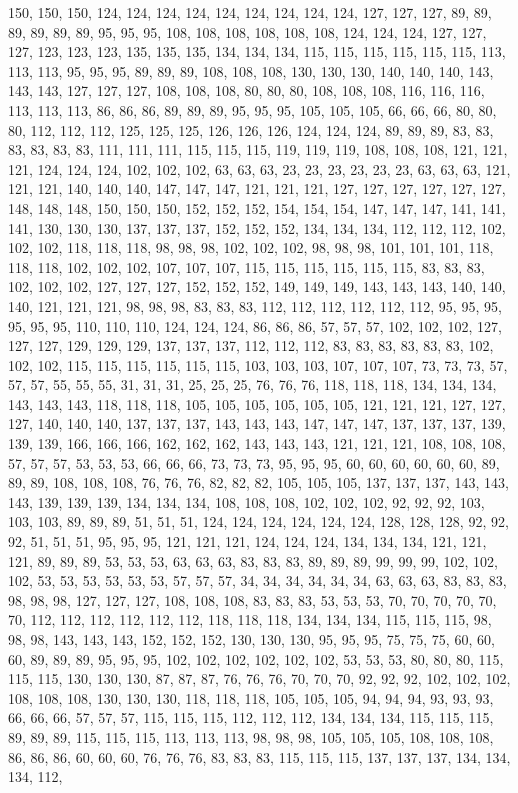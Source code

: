 150, 150, 150, 124, 124, 124, 124, 124, 124, 124, 124, 124, 127, 127, 127, 89, 89, 89, 89, 89, 89, 95, 95, 95, 108, 108, 108, 108, 108, 108, 124, 124, 124, 127, 127, 127, 123, 123, 123, 135, 135, 135, 134, 134, 134, 115, 115, 115, 115, 115, 115, 113, 113, 113, 95, 95, 95, 89, 89, 89, 108, 108, 108, 130, 130, 130, 140, 140, 140, 143, 143, 143, 127, 127, 127, 108, 108, 108, 80, 80, 80, 108, 108, 108, 116, 116, 116, 113, 113, 113, 86, 86, 86, 89, 89, 89, 95, 95, 95, 105, 105, 105, 66, 66, 66, 80, 80, 80, 112, 112, 112, 125, 125, 125, 126, 126, 126, 124, 124, 124, 89, 89, 89, 83, 83, 83, 83, 83, 83, 111, 111, 111, 115, 115, 115, 119, 119, 119, 108, 108, 108, 121, 121, 121, 124, 124, 124, 102, 102, 102, 63, 63, 63, 23, 23, 23, 23, 23, 23, 63, 63, 63, 121, 121, 121, 140, 140, 140, 147, 147, 147, 121, 121, 121, 127, 127, 127, 127, 127, 127, 148, 148, 148, 150, 150, 150, 152, 152, 152, 154, 154, 154, 147, 147, 147, 141, 141, 141, 130, 130, 130, 137, 137, 137, 152, 152, 152, 134, 134, 134, 112, 112, 112, 102, 102, 102, 118, 118, 118, 98, 98, 98, 102, 102, 102, 98, 98, 98, 101, 101, 101, 118, 118, 118, 102, 102, 102, 107, 107, 107, 115, 115, 115, 115, 115, 115, 83, 83, 83, 102, 102, 102, 127, 127, 127, 152, 152, 152, 149, 149, 149, 143, 143, 143, 140, 140, 140, 121, 121, 121, 98, 98, 98, 83, 83, 83, 112, 112, 112, 112, 112, 112, 95, 95, 95, 95, 95, 95, 110, 110, 110, 124, 124, 124, 86, 86, 86, 57, 57, 57, 102, 102, 102, 127, 127, 127, 129, 129, 129, 137, 137, 137, 112, 112, 112, 83, 83, 83, 83, 83, 83, 102, 102, 102, 115, 115, 115, 115, 115, 115, 103, 103, 103, 107, 107, 107, 73, 73, 73, 57, 57, 57, 55, 55, 55, 31, 31, 31, 25, 25, 25, 76, 76, 76, 118, 118, 118, 134, 134, 134, 143, 143, 143, 118, 118, 118, 105, 105, 105, 105, 105, 105, 121, 121, 121, 127, 127, 127, 140, 140, 140, 137, 137, 137, 143, 143, 143, 147, 147, 147, 137, 137, 137, 139, 139, 139, 166, 166, 166, 162, 162, 162, 143, 143, 143, 121, 121, 121, 108, 108, 108, 57, 57, 57, 53, 53, 53, 66, 66, 66, 73, 73, 73, 95, 95, 95, 60, 60, 60, 60, 60, 60, 89, 89, 89, 108, 108, 108, 76, 76, 76, 82, 82, 82, 105, 105, 105, 137, 137, 137, 143, 143, 143, 139, 139, 139, 134, 134, 134, 108, 108, 108, 102, 102, 102, 92, 92, 92, 103, 103, 103, 89, 89, 89, 51, 51, 51, 124, 124, 124, 124, 124, 124, 128, 128, 128, 92, 92, 92, 51, 51, 51, 95, 95, 95, 121, 121, 121, 124, 124, 124, 134, 134, 134, 121, 121, 121, 89, 89, 89, 53, 53, 53, 63, 63, 63, 83, 83, 83, 89, 89, 89, 99, 99, 99, 102, 102, 102, 53, 53, 53, 53, 53, 53, 57, 57, 57, 34, 34, 34, 34, 34, 34, 63, 63, 63, 83, 83, 83, 98, 98, 98, 127, 127, 127, 108, 108, 108, 83, 83, 83, 53, 53, 53, 70, 70, 70, 70, 70, 70, 112, 112, 112, 112, 112, 112, 118, 118, 118, 134, 134, 134, 115, 115, 115, 98, 98, 98, 143, 143, 143, 152, 152, 152, 130, 130, 130, 95, 95, 95, 75, 75, 75, 60, 60, 60, 89, 89, 89, 95, 95, 95, 102, 102, 102, 102, 102, 102, 53, 53, 53, 80, 80, 80, 115, 115, 115, 130, 130, 130, 87, 87, 87, 76, 76, 76, 70, 70, 70, 92, 92, 92, 102, 102, 102, 108, 108, 108, 130, 130, 130, 118, 118, 118, 105, 105, 105, 94, 94, 94, 93, 93, 93, 66, 66, 66, 57, 57, 57, 115, 115, 115, 112, 112, 112, 134, 134, 134, 115, 115, 115, 89, 89, 89, 115, 115, 115, 113, 113, 113, 98, 98, 98, 105, 105, 105, 108, 108, 108, 86, 86, 86, 60, 60, 60, 76, 76, 76, 83, 83, 83, 115, 115, 115, 137, 137, 137, 134, 134, 134, 112, 